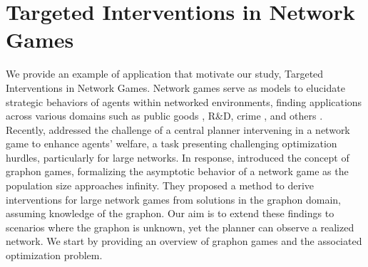 \documentclass[11pt]{article}
\newcommand{\<}{\langle}
\renewcommand{\>}{\rangle}
\theoremstyle{plain}
\theoremstyle{definition}
\theoremstyle{remark}
\begin{document}
\section{Targeted Interventions in Network Games}
\label{section: motivating applications}
We provide an example of application that motivate our study, Targeted Interventions in Network Games. %
Network games serve as models to elucidate strategic behaviors of agents within networked environments, finding applications across various domains such as public goods \newline \citep{BRAMOULLE_public_goods}, R\&D, crime \citep{bramoulle_interactions}, and others \citep{galeotti_jackson_network_games,francesca_review}. Recently, \citet{galeotti_interventions} addressed the challenge of a central planner intervening in a network game to enhance agents' welfare, a task presenting challenging optimization hurdles, particularly for large networks.
In response, \cite{Parise_Ozdaglar_Econometrica} introduced the concept of graphon games, formalizing the asymptotic behavior of a network game as the population size approaches infinity. They proposed a method to derive interventions for large network games from solutions in the graphon domain, assuming knowledge of the graphon. Our aim is to extend these findings to scenarios where the graphon is unknown, yet the planner can observe a realized network. We start by providing an overview of graphon games and the associated optimization problem. 

\end{document}
